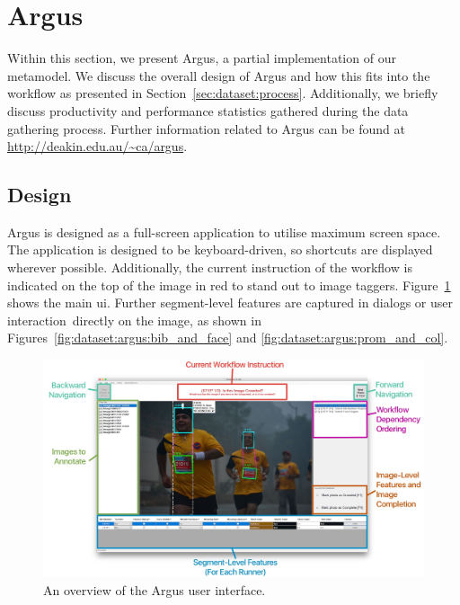 \section{Argus}
\label{sec:dataset:argus}

Within this section, we present Argus, a partial implementation of our metamodel. We discuss the overall design of Argus and how this fits into the workflow as presented in Section~\ref{sec:dataset:process}. Additionally, we briefly discuss productivity and performance statistics gathered during the data gathering process. Further information related to Argus can be found at \url{http://deakin.edu.au/~ca/argus}.

\subsection{Design}

Argus is designed as a full-screen application to utilise maximum screen space. The application is designed to be keyboard-driven, so shortcuts are displayed wherever possible. Additionally, the current instruction of the workflow is indicated on the top of the image in red to stand out to image taggers. Figure~\ref{fig:dataset:argus:overview} shows the main \gls{ui}. Further segment-level features are captured in dialogs or user interaction directly on the image, as shown in Figures~\ref{fig:dataset:argus:bib_and_face} and \ref{fig:dataset:argus:prom_and_col}.

\begin{figure}[h]
  \centering
  \includegraphics[width=\textwidth]{images/dataset/argus/argus_ui}
  \caption[An overview of the Argus user interface]{An overview of the Argus user interface.}
  \label{fig:dataset:argus:overview}
\end{figure}

